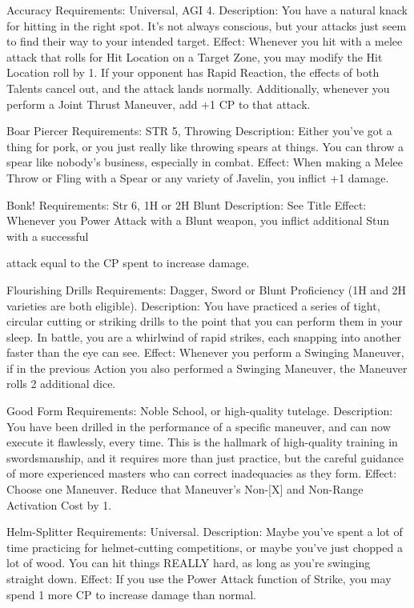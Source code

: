 \documentclass[oneside,11pt,english]{book}
\begin{document}
Accuracy
Requirements: Universal, AGI 4. 
Description: You have a natural knack for hitting in the right spot. It's not always conscious, but your 
attacks just seem to find their way to your intended target. 
Effect: Whenever you hit with a melee attack that rolls for Hit Location on a Target Zone, you may 
modify the Hit Location roll by 1. If your opponent has Rapid Reaction, the effects of both Talents cancel 
out, and the attack lands normally. 
Additionally, whenever you perform a Joint Thrust Maneuver, add +1 CP to that attack. 

 

Boar Piercer 
Requirements: STR 5, Throwing 
Description: Either you’ve got a thing for pork, or you just really like throwing spears at things. You can 
throw a spear like nobody’s business, especially in combat. 
Effect: When making a Melee Throw or Fling with a Spear or any variety of Javelin, you inflict +1 
damage. 

 

Bonk! 
Requirements: Str 6, 1H or 2H Blunt 
Description: See Title 
Effect: Whenever you Power Attack with a Blunt weapon, you inflict additional Stun with a successful 


attack equal to the CP spent to increase damage. 

 

Flourishing Drills 
Requirements: Dagger, Sword or Blunt Proficiency (1H and 2H varieties are both eligible). 
Description: You have practiced a series of tight, circular cutting or striking drills to the point that you 
can perform them in your sleep. In battle, you are a whirlwind of rapid strikes, each snapping into another 
faster than the eye can see. 
Effect: Whenever you perform a Swinging Maneuver, if in the previous Action you also performed a 
Swinging Maneuver, the Maneuver rolls 2 additional dice. 

 

Good Form 
Requirements: Noble School, or high-quality tutelage. 
Description: You have been drilled in the performance of a specific maneuver, and can now execute it 
flawlessly, every time. This is the hallmark of high-quality training in swordsmanship, and it requires 
more than just practice, but the careful guidance of more experienced masters who can correct 
inadequacies as they form. 
Effect: Choose one Maneuver. Reduce that Maneuver’s Non-[X] and Non-Range Activation Cost by 1. 

 

Helm-Splitter 
Requirements: Universal. 
Description: Maybe you've spent a lot of time practicing for helmet-cutting competitions, or maybe 
you've just chopped a lot of wood. You can hit things REALLY hard, as long as you’re swinging straight 
down. 
Effect: If you use the Power Attack function of Strike, you may spend 1 more CP to increase damage 
than normal. 
\end{document}
